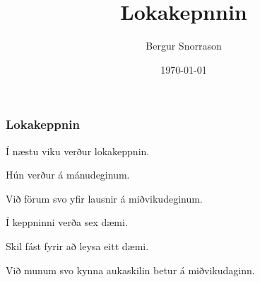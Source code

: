 \title{Lokakepnnin}
\author{Bergur Snorrason}
\date{\today}



\frame{\titlepage}

{
	\frametitle{Lokakeppnin}
	{
		\item<1-> Í næstu viku verður lokakeppnin.
		\item<2-> Hún verður á mánudeginum.
		\item<3-> Við förum svo yfir lausnir á miðvikudeginum.
		\item<4-> Í keppninni verða sex dæmi.
		\item<5-> Skil fást fyrir að leysa eitt dæmi.
		\item<6-> Við munum svo kynna aukaskilin betur á miðvikudaginn.
	}
}

{
}


